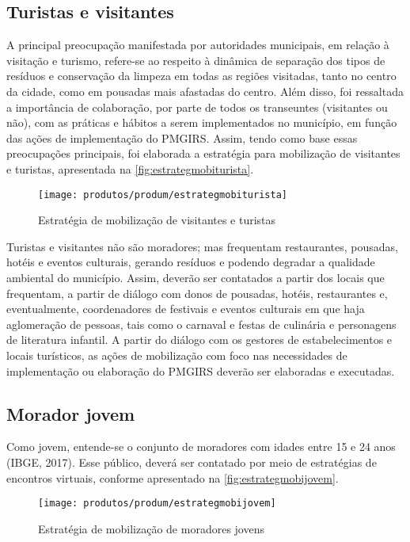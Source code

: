 \subsection{Turistas e visitantes}
A principal preocupação manifestada por autoridades municipais, em relação à visitação e turismo, refere-se ao respeito à dinâmica de separação dos tipos de resíduos e conservação da limpeza em todas as regiões visitadas, tanto no centro da cidade, como em pousadas mais afastadas do centro.  Além disso, foi ressaltada a importância de colaboração, por parte de todos os transeuntes (visitantes ou não), com as práticas e hábitos a serem implementados no município, em função das ações de implementação do PMGIRS. Assim, tendo como base essas preocupações principais, foi elaborada a estratégia para mobilização de visitantes e turistas, apresentada na \autoref{fig:estrategmobiturista}.

\begin{figure}[h!]
	\centering
	\texttt{[image: produtos/produm/estrategmobiturista]}
	\caption{Estratégia de mobilização de visitantes e turistas}
	\label{fig:estrategmobiturista}
\end{figure}

Turistas e visitantes não são moradores; mas frequentam restaurantes, pousadas, hotéis e eventos culturais, gerando resíduos e podendo degradar a qualidade ambiental do município. Assim, deverão ser contatados a partir dos locais que frequentam, a partir de diálogo com donos de pousadas, hotéis, restaurantes e, eventualmente, coordenadores de festivais e eventos culturais em que haja aglomeração de pessoas, tais como o carnaval e festas de culinária e personagens de literatura infantil. A partir do diálogo com os gestores de estabelecimentos e locais turísticos, as ações de mobilização com foco nas necessidades de implementação ou elaboração do PMGIRS deverão ser elaboradas e executadas.


\subsection{Morador jovem}

Como jovem, entende-se o conjunto de moradores com idades entre 15 e 24 anos (IBGE, 2017).  Esse público, deverá ser contatado por meio de estratégias de encontros virtuais, conforme apresentado na \autoref{fig:estrategmobijovem}.

\begin{figure}[h!]
	\centering
	\texttt{[image: produtos/produm/estrategmobijovem]}
	\caption{Estratégia de mobilização de moradores jovens}
	\label{fig:estrategmobijovem}
\end{figure}

